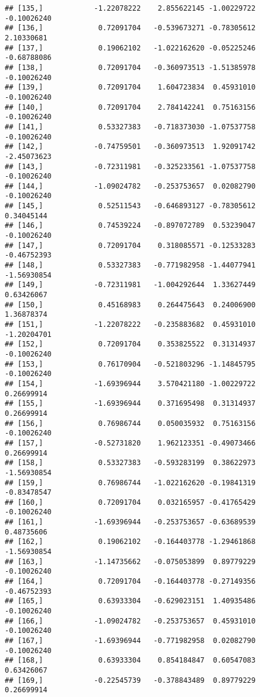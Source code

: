 \documentclass[
]{article}
\begin{document}
\begin{verbatim}
## [135,]            -1.22078222    2.855622145 -1.00229722    -0.10026240
## [136,]             0.72091704   -0.539673271 -0.78305612     2.10330681
## [137,]             0.19062102   -1.022162620 -0.05225246    -0.68788086
## [138,]             0.72091704   -0.360973513 -1.51385978    -0.10026240
## [139,]             0.72091704    1.604723834  0.45931010    -0.10026240
## [140,]             0.72091704    2.784142241  0.75163156    -0.10026240
## [141,]             0.53327383   -0.718373030 -1.07537758    -0.10026240
## [142,]            -0.74759501   -0.360973513  1.92091742    -2.45073623
## [143,]            -0.72311981   -0.325233561 -1.07537758    -0.10026240
## [144,]            -1.09024782   -0.253753657  0.02082790    -0.10026240
## [145,]             0.52511543   -0.646893127 -0.78305612     0.34045144
## [146,]             0.74539224   -0.897072789  0.53239047    -0.10026240
## [147,]             0.72091704    0.318085571 -0.12533283    -0.46752393
## [148,]             0.53327383   -0.771982958 -1.44077941    -1.56930854
## [149,]            -0.72311981   -1.004292644  1.33627449     0.63426067
## [150,]             0.45168983    0.264475643  0.24006900     1.36878374
## [151,]            -1.22078222   -0.235883682  0.45931010    -1.20204701
## [152,]             0.72091704    0.353825522  0.31314937    -0.10026240
## [153,]             0.76170904   -0.521803296 -1.14845795    -0.10026240
## [154,]            -1.69396944    3.570421180 -1.00229722     0.26699914
## [155,]            -1.69396944    0.371695498  0.31314937     0.26699914
## [156,]             0.76986744    0.050035932  0.75163156    -0.10026240
## [157,]            -0.52731820    1.962123351 -0.49073466     0.26699914
## [158,]             0.53327383   -0.593283199  0.38622973    -1.56930854
## [159,]             0.76986744   -1.022162620 -0.19841319    -0.83478547
## [160,]             0.72091704    0.032165957 -0.41765429    -0.10026240
## [161,]            -1.69396944   -0.253753657 -0.63689539     0.48735606
## [162,]             0.19062102   -0.164403778 -1.29461868    -1.56930854
## [163,]            -1.14735662   -0.075053899  0.89779229    -0.10026240
## [164,]             0.72091704   -0.164403778 -0.27149356    -0.46752393
## [165,]             0.63933304   -0.629023151  1.40935486    -0.10026240
## [166,]            -1.09024782   -0.253753657  0.45931010    -0.10026240
## [167,]            -1.69396944   -0.771982958  0.02082790    -0.10026240
## [168,]             0.63933304    0.854184847  0.60547083     0.63426067
## [169,]            -0.22545739   -0.378843489  0.89779229     0.26699914

\end{verbatim}
\end{document}
